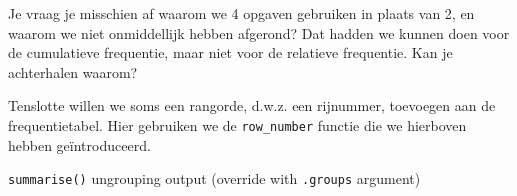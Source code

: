 \documentclass[]{tufte-book}
\newenvironment{Shaded}{}{}
\newcommand{\DataTypeTok}[1]{\textcolor[rgb]{0.56,0.13,0.00}{#1}}
\newcommand{\DecValTok}[1]{\textcolor[rgb]{0.25,0.63,0.44}{#1}}
\newcommand{\KeywordTok}[1]{\textcolor[rgb]{0.00,0.44,0.13}{\textbf{#1}}}
\newcommand{\NormalTok}[1]{#1}
\newcommand{\OperatorTok}[1]{\textcolor[rgb]{0.40,0.40,0.40}{#1}}
\newcommand{\StringTok}[1]{\textcolor[rgb]{0.25,0.44,0.63}{#1}}
\begin{document}
Je vraag je misschien af waarom we 4 opgaven gebruiken in plaats van 2, en waarom we niet onmiddellijk hebben afgerond? Dat hadden we kunnen doen voor de cumulatieve frequentie, maar niet voor de relatieve frequentie. Kan je achterhalen waarom?

Tenslotte willen we soms een rangorde, d.w.z. een rijnummer, toevoegen aan de frequentietabel. Hier gebruiken we de \texttt{row\_number} functie die we hierboven hebben geïntroduceerd.

\begin{Shaded}
\end{Shaded}

\texttt{summarise()} ungrouping output (override with \texttt{.groups} argument)
\end{document}
